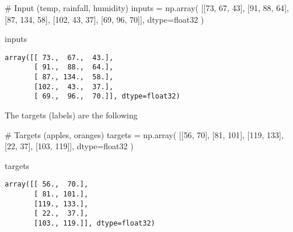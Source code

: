\documentclass[
  letterpaper,
  DIV=11,
  numbers=noendperiod]{scrartcl}
\newenvironment{Shaded}{\begin{snugshade}}{\end{snugshade}}
\newcommand{\CommentTok}[1]{\textcolor[rgb]{0.37,0.37,0.37}{#1}}
\newcommand{\DecValTok}[1]{\textcolor[rgb]{0.68,0.00,0.00}{#1}}
\newcommand{\NormalTok}[1]{\textcolor[rgb]{0.00,0.23,0.31}{#1}}
\newcommand{\OperatorTok}[1]{\textcolor[rgb]{0.37,0.37,0.37}{#1}}
\newcommand{\StringTok}[1]{\textcolor[rgb]{0.13,0.47,0.30}{#1}}
\begin{document}
\begin{Shaded}
\begin{Highlighting}[]
\CommentTok{\# Input (temp, rainfall, humidity)}
\NormalTok{inputs }\OperatorTok{=}\NormalTok{ np.array(}
\NormalTok{    [[}\DecValTok{73}\NormalTok{, }\DecValTok{67}\NormalTok{, }\DecValTok{43}\NormalTok{],}
\NormalTok{    [}\DecValTok{91}\NormalTok{, }\DecValTok{88}\NormalTok{, }\DecValTok{64}\NormalTok{],}
\NormalTok{    [}\DecValTok{87}\NormalTok{, }\DecValTok{134}\NormalTok{, }\DecValTok{58}\NormalTok{],}
\NormalTok{    [}\DecValTok{102}\NormalTok{, }\DecValTok{43}\NormalTok{, }\DecValTok{37}\NormalTok{],}
\NormalTok{    [}\DecValTok{69}\NormalTok{, }\DecValTok{96}\NormalTok{, }\DecValTok{70}\NormalTok{]], }
\NormalTok{    dtype}\OperatorTok{=}\StringTok{\textquotesingle{}float32\textquotesingle{}}
\NormalTok{)}

\NormalTok{inputs}
\end{Highlighting}
\end{Shaded}

\begin{verbatim}
array([[ 73.,  67.,  43.],
       [ 91.,  88.,  64.],
       [ 87., 134.,  58.],
       [102.,  43.,  37.],
       [ 69.,  96.,  70.]], dtype=float32)
\end{verbatim}

The targets (labels) are the following

\begin{Shaded}
\begin{Highlighting}[]
\CommentTok{\# Targets (apples, oranges)}
\NormalTok{targets }\OperatorTok{=}\NormalTok{ np.array(}
\NormalTok{    [[}\DecValTok{56}\NormalTok{, }\DecValTok{70}\NormalTok{],}
\NormalTok{    [}\DecValTok{81}\NormalTok{, }\DecValTok{101}\NormalTok{],}
\NormalTok{    [}\DecValTok{119}\NormalTok{, }\DecValTok{133}\NormalTok{],}
\NormalTok{    [}\DecValTok{22}\NormalTok{, }\DecValTok{37}\NormalTok{],}
\NormalTok{    [}\DecValTok{103}\NormalTok{, }\DecValTok{119}\NormalTok{]], }
\NormalTok{    dtype}\OperatorTok{=}\StringTok{\textquotesingle{}float32\textquotesingle{}}
\NormalTok{)}

\NormalTok{targets}
\end{Highlighting}
\end{Shaded}

\begin{verbatim}
array([[ 56.,  70.],
       [ 81., 101.],
       [119., 133.],
       [ 22.,  37.],
       [103., 119.]], dtype=float32)
\end{verbatim}
\end{document}
